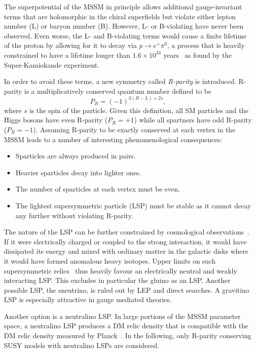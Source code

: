 The superpotential of the MSSM in principle allows additional gauge-invariant terms that are holomorphic in the chiral superfields but violate either lepton number (L) or baryon number (B). However, L- or B-violating have never been observed. Even worse, the L- and B-violating terms would cause a finite lifetime of the proton by allowing for it to decay \eg via $p\rightarrow e^+ \pi^0$, a process that is heavily constrained to have a lifetime longer than $1.6\times 10^{34}$ years~\cite{Miura:2016krn} as found by the Super-Kamiokande experiment.

In order to avoid these terms, a new symmetry called \textit{R-parity} is introduced. R-parity is a multiplicatively conserved quantum number defined to be
\begin{equation}
	P_R = (-1)^{3(B-L)+2s},
	\label{eq:rparity}
\end{equation}
where $s$ is the spin of the particle. Given this definition, all SM particles and the Higgs bosons have even R-parity ($P_R = +1$) while all spartners have odd R-parity ($P_R = -1$). Assuming R-parity to be exactly conserved at each vertex in the MSSM leads to a number of interesting phenomenological consequences:
\begin{itemize}
	\item Sparticles are always produced in pairs.
	\item Heavier sparticles decay into lighter ones.
	\item The number of sparticles at each vertex must be even.
	\item The lightest supersymmetric particle (LSP) must be stable as it cannot decay any further without violating R-parity.	
\end{itemize}
The nature of the LSP can be further constrained by cosmological observations~\cite{Ellis:1998eh}. If it were electrically charged or coupled to the strong interaction, it would have dissipated its energy and mixed with ordinary matter in the galactic disks where it would have formed anomalous heavy isotopes. Upper limits on such supersymmetric relics~\cite{Ellis:1983ew} thus heavily favour an electrically neutral and weakly interacting LSP. This excludes in particular the gluino as an LSP. Another possible LSP, the sneutrino, is ruled out by LEP and direct searches. A gravitino LSP is especially attractive in gauge mediated theories. 

Another option is a neutralino LSP. In large portions of the MSSM parameter space, a neutralino LSP produces a DM relic density that is compatible with the DM relic density measured by Planck~\cite{Ellis:1983ew, Aghanim:2018eyx}. In the following, only R-parity conserving SUSY models with neutralino LSPs are considered.


